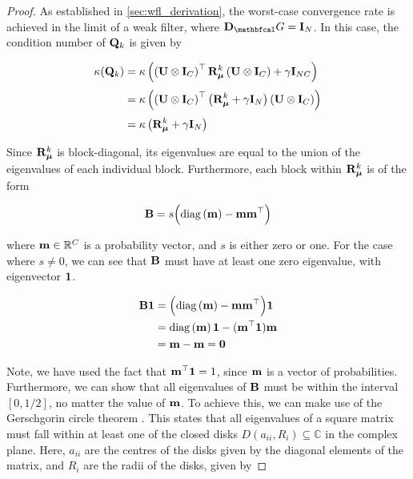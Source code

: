 \begin{proof}
    As established in \cref{sec:wfl_derivation}, the worst-case convergence rate is achieved in the limit of a weak filter, where $\D_\Gt = \I_N$. In this case, the condition number of $\mathbf{Q}_k$ is given by 

    \begin{align*}
        \kappa(\mathbf{Q}_k) &= \kappa\left( \left(\mathbf{U} \otimes \mathbf{I}_C\right)^\top \mathbf{R}_{\boldsymbol{\mu}}^k \left(\mathbf{U} \otimes \mathbf{I}_C\right) + \gamma \mathbf{I}_{NC}\right) \\[0.1cm]
        &=  \kappa\left( \left(\mathbf{U} \otimes \mathbf{I}_C\right)^\top \left(\mathbf{R}_{\boldsymbol{\mu}}^k + \gamma \mathbf{I}_N\right) \left(\mathbf{U} \otimes \mathbf{I}_C\right)  \right) \\[0.1cm]
        &= \kappa\left( \mathbf{R}_{\boldsymbol{\mu}}^k + \gamma \mathbf{I}_N\right)
    \end{align*}

    Since $\mathbf{R}_{\boldsymbol{\mu}}^k$ is block-diagonal, its eigenvalues are equal to the union of the eigenvalues of each individual block. Furthermore, each block within  $\mathbf{R}_{\boldsymbol{\mu}}^k$ is of the form

    \begin{equation*}
        \mathbf{B} = s \Big(\text{\textup{diag}}\left(\mathbf{m}\right) - \mathbf{m} \mathbf{m}^\top\Big)
    \end{equation*}
    
    where $\mathbf{m} \in \mathbb{R}^C$ is a probability vector, and $s$ is either zero or one. For the case where $s \neq 0$, we can see that $\mathbf{B}$ must have at least one zero eigenvalue, with eigenvector $\mathbf{1}$.     

    \begin{align*}
        \mathbf{B} \mathbf{1} &= \Big(\text{\textup{diag}}\left(\mathbf{m}\right) - \mathbf{m} \mathbf{m}^\top\Big) \mathbf{1} \\
        &= \text{\textup{diag}}\left(\mathbf{m}\right) \mathbf{1} - (\mathbf{m}^\top \mathbf{1}) \mathbf{m} \\
        &= \mathbf{m} - \mathbf{m} = \mathbf{0}
    \end{align*}

    Note, we have used the fact that $\mathbf{m}^\top \mathbf{1} = 1$, since $\mathbf{m}$ is a vector of probabilities. Furthermore, we can show that all eigenvalues of $\mathbf{B}$ must be within the interval $[0, 1/2]$, no matter the value of $\mathbf{m}$.  To achieve this, we can make use of the Gerschgorin circle theorem \citep{Gerschgorin1931}. This states that all eigenvalues of a square matrix must fall within at least one of the closed disks $D(a_{ii}, R_i) \subseteq \mathbb{C}$ in the complex plane. Here, $a_{ii}$ are the centres of the disks given by the diagonal elements of the matrix, and $R_i$ are the radii of the disks, given by 


\end{proof}

